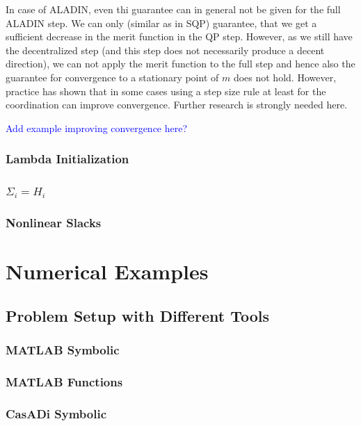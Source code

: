 \documentclass[]{scrartcl}
\begin{document}
In case of ALADIN, even thi guarantee can in general not be given for the full ALADIN step.
We can only (similar as in SQP) guarantee, that we get a sufficient decrease in the merit function in the QP step.
However, as we still have the decentralized step (and this step does not necessarily produce a decent direction), we can not apply the merit function to the full step and hence also the guarantee for convergence to a stationary point of $m$ does not hold. 
However, practice has shown that in some cases using a step size rule at least for the coordination can improve convergence.
Further research is strongly needed here. 

\textcolor{blue}{Add example improving convergence here?}

\subsubsection{Lambda Initialization}
\subsubsection{$\Sigma_i=H_i$}
\subsubsection{Nonlinear Slacks}



\section{Numerical Examples}
\subsection{Problem Setup with Different Tools}
\subsubsection{MATLAB Symbolic}




\subsubsection{MATLAB Functions}
\subsubsection{CasADi Symbolic}
\end{document}
